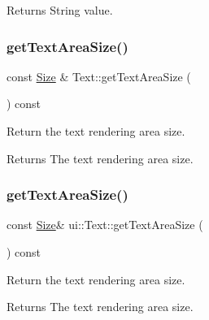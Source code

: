 \begin{DoxyReturn}{Returns}
String value. 
\end{DoxyReturn}
\mbox{\label{classui_1_1Text_ab2932885885b8e3b56e9eac14ea7c8cf}} 
\subsubsection{\texorpdfstring{get\+Text\+Area\+Size()}{getTextAreaSize()}\hspace{0.1cm}{\footnotesize\ttfamily [1/2]}}
{\footnotesize\ttfamily const \hyperlink{classSize}{Size} \& Text\+::get\+Text\+Area\+Size (\begin{DoxyParamCaption}{ }\end{DoxyParamCaption}) const}

Return the text rendering area size.

\begin{DoxyReturn}{Returns}
The text rendering area size. 
\end{DoxyReturn}
\mbox{\label{classui_1_1Text_a2550cb716254fd8de865bfd718d609db}} 
\subsubsection{\texorpdfstring{get\+Text\+Area\+Size()}{getTextAreaSize()}\hspace{0.1cm}{\footnotesize\ttfamily [2/2]}}
{\footnotesize\ttfamily const \hyperlink{classSize}{Size}\& ui\+::\+Text\+::get\+Text\+Area\+Size (\begin{DoxyParamCaption}{ }\end{DoxyParamCaption}) const}

Return the text rendering area size.

\begin{DoxyReturn}{Returns}
The text rendering area size. 
\end{DoxyReturn}
\mbox{\label{classui_1_1Text_aaa188060aad37b5f6df4665a2b7d0f16}} 
